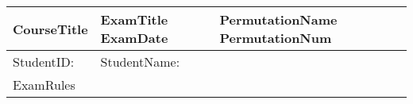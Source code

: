 \documentclass[11pt,a4paper]{article}
\begin{document}
\pagestyle{empty}

\begin{table}[ht]
  \begin{center}
    \begin{tabular}{|l|l|l|}
      \hline
      {\bf {{{CourseTitle}}} } \quad &  {{{ExamTitle}}} {{{ExamDate}}} \quad \quad \quad \quad \quad & {{{PermutationName}}} {{{PermutationNum}}}  \\
      \hline
      {{StudentID}}: & \multicolumn{2}{|l|}{ {{StudentName}}: } \\ \hline
      \multicolumn{3}{|l|}{
      \begin{minipage}{\textwidth}
      {{{ExamRules}}}
      \end{minipage}}
      \\ \hline
    \end{tabular}
  \end{center}
\end{table}
\end{document}
